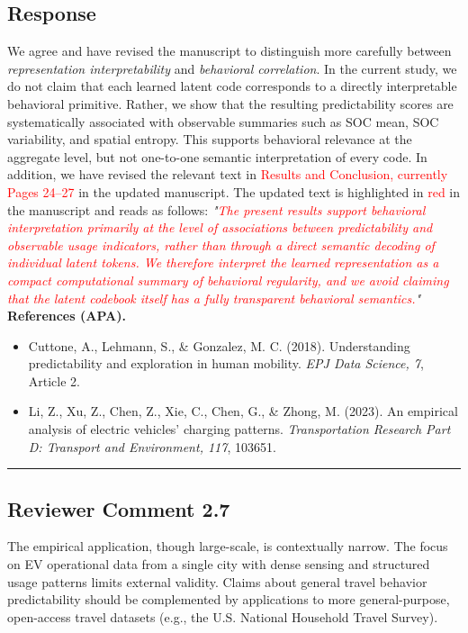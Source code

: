 \documentclass{NSF}
\begin{document}
\subsection{Response}
We agree and have revised the manuscript to distinguish more carefully between \emph{representation interpretability} and \emph{behavioral correlation}. In the current study, we do not claim that each learned latent code corresponds to a directly interpretable behavioral primitive. Rather, we show that the resulting predictability scores are systematically associated with observable summaries such as SOC mean, SOC variability, and spatial entropy. This supports behavioral relevance at the aggregate level, but not one-to-one semantic interpretation of every code.
\noindent In addition, we have revised the relevant text in \textcolor{red}{Results and Conclusion, currently Pages 24--27} in the updated manuscript. The updated text is highlighted in \textcolor{red}{red} in the manuscript and reads as follows:
\vskip 0.1cm
\noindent \textit{"\textcolor{red}{The present results support behavioral interpretation primarily at the level of \emph{associations} between predictability and observable usage indicators, rather than through a direct semantic decoding of individual latent tokens. We therefore interpret the learned representation as a compact computational summary of behavioral regularity, and we avoid claiming that the latent codebook itself has a fully transparent behavioral semantics.}"}
\vskip 0.05in
\noindent\textbf{References (APA).}
\begin{itemize}
    \item Cuttone, A., Lehmann, S., \& Gonzalez, M. C. (2018). Understanding predictability and exploration in human mobility. \textit{EPJ Data Science, 7}, Article 2.
    \item Li, Z., Xu, Z., Chen, Z., Xie, C., Chen, G., \& Zhong, M. (2023). An empirical analysis of electric vehicles' charging patterns. \textit{Transportation Research Part D: Transport and Environment, 117}, 103651.
\end{itemize}

\noindent\rule{16.5cm}{1.0pt}

\subsection{Reviewer Comment 2.7}
\begin{mdframed}
The empirical application, though large-scale, is contextually narrow. The focus on EV operational data from a single city with dense sensing and structured usage patterns limits external validity. Claims about general travel behavior predictability should be complemented by applications to more general-purpose, open-access travel datasets (e.g., the U.S. National Household Travel Survey).
\end{mdframed}
\end{document}
